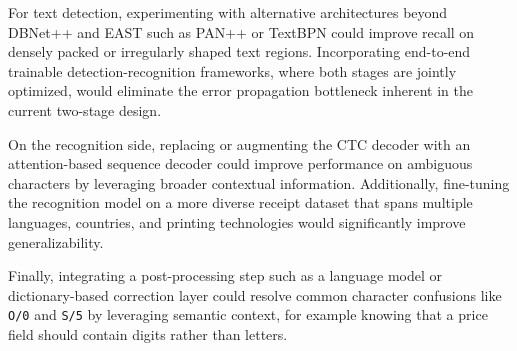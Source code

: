 For text detection, experimenting with alternative architectures beyond DBNet++ and EAST
such as PAN++ or TextBPN could improve recall on densely packed or irregularly shaped
text regions. Incorporating end-to-end trainable detection-recognition frameworks, where
both stages are jointly optimized, would eliminate the error propagation bottleneck inherent
in the current two-stage design.

On the recognition side, replacing or augmenting the CTC decoder with an attention-based
sequence decoder could improve performance on ambiguous characters by leveraging broader
contextual information. Additionally, fine-tuning the recognition model on a more diverse
receipt dataset that spans multiple languages, countries, and printing technologies would
significantly improve generalizability.

Finally, integrating a post-processing step such as a language model or dictionary-based
correction layer could resolve common character confusions like \texttt{O/0} and
\texttt{S/5} by leveraging semantic context, for example knowing that a price field should
contain digits rather than letters.
